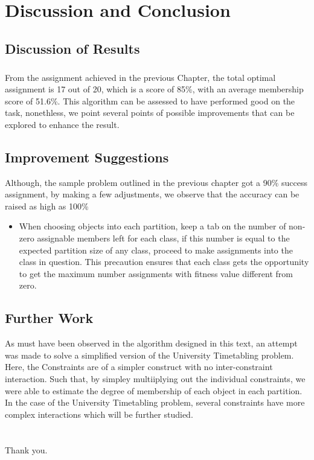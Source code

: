 \documentclass[a4paper]{book}
\begin{document}
	\chapter{Discussion and Conclusion}
		\section{Discussion of Results}
			\paragraph{}
				From the assignment achieved in the previous Chapter, the total optimal assignment is 17 out of 20, which is a score of 85\%, with an average membership score of 51.6\%. This algorithm can be assessed to have performed good on the task, nonethless, we point several points of possible improvements that can be explored to enhance the result.
		\section{Improvement Suggestions}
			Although, the sample problem outlined in the previous chapter got a 90\% success assignment, by making a few adjustments, we observe that the accuracy can be raised as high as 100\%
			\begin{itemize}
				\item When choosing objects into each partition, keep a tab on the number of non-zero assignable members left for each class, if this number is equal to the expected partition size of any class, proceed to make assignments into the class in question. This precaution ensures that each class gets the opportunity to get the maximum number assignments with fitness value different from zero.
			\end{itemize}
		\section{Further Work}
			As must have been observed in the algorithm designed in this text, an attempt was made to solve a simplified version of the University Timetabling problem. Here, the Constraints are of a simpler construct with no inter-constraint interaction. Such that, by simpley multiiplying out the individual constraints, we were able to estimate the degree of membership of each object in each partition. In the case of the University Timetabling problem, several constraints have more complex interactions which will be further studied.\\ \\ \\
			Thank you.
\end{document}
